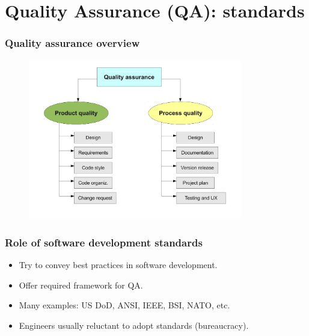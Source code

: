 \documentclass{beamer}
\begin{document}

\section{Quality Assurance (QA): standards}


\begin{frame}
\frametitle{Quality assurance overview}
\begin{center}
\begin{figure}
 \includegraphics[height=7cm]{figs/quality-assurance.pdf}
\end{figure}
\end{center}
\end{frame}


\begin{frame}
 \frametitle{Role of software development standards}
 \begin{itemize}
 \item Try to convey best practices in software development.
 \item Offer required framework for QA.
 \item Many examples: US DoD, ANSI, IEEE, BSI, NATO, etc.
 \item Engineers usually reluctant to adopt standards (bureaucracy).
 \end{itemize}
\end{frame}

\end{document}
